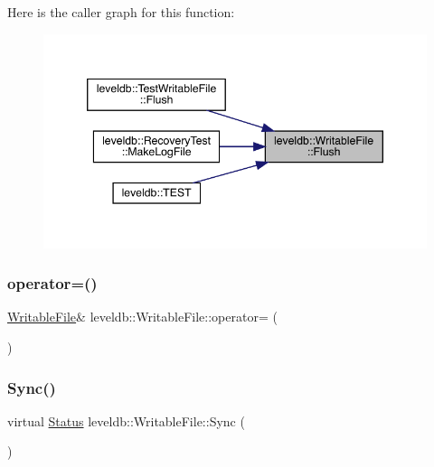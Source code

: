 Here is the caller graph for this function\+:
\nopagebreak
\begin{figure}[H]
\begin{center}
\leavevmode
\includegraphics[width=346pt]{classleveldb_1_1_writable_file_ab95759ad32f6a05b0ee4266969fa265e_icgraph}
\end{center}
\end{figure}
\mbox{\label{classleveldb_1_1_writable_file_a953e5d740da7a2ff3dccdca043901bb3}} 
\subsubsection{\texorpdfstring{operator=()}{operator=()}}
{\footnotesize\ttfamily \mbox{\hyperlink{classleveldb_1_1_writable_file}{Writable\+File}}\& leveldb\+::\+Writable\+File\+::operator= (\begin{DoxyParamCaption}\item[{const \mbox{\hyperlink{classleveldb_1_1_writable_file}{Writable\+File}} \&}]{ }\end{DoxyParamCaption})\hspace{0.3cm}{\ttfamily [delete]}}

\mbox{\label{classleveldb_1_1_writable_file_a2d2dcef02a2c9e71f3d39125bcd5a606}} 
\subsubsection{\texorpdfstring{Sync()}{Sync()}}
{\footnotesize\ttfamily virtual \mbox{\hyperlink{classleveldb_1_1_status}{Status}} leveldb\+::\+Writable\+File\+::\+Sync (\begin{DoxyParamCaption}{ }\end{DoxyParamCaption})\hspace{0.3cm}{\ttfamily [pure virtual]}}



